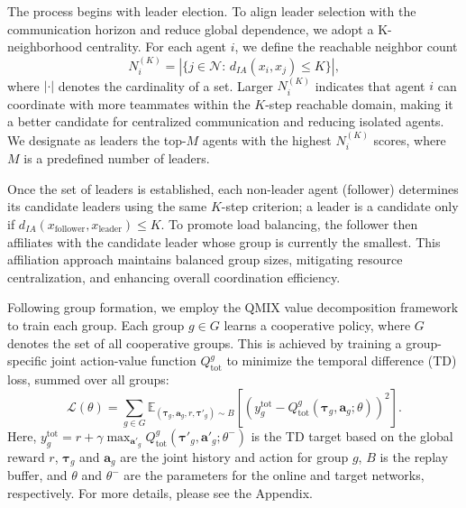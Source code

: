 \documentclass[10pt]{article} %
\newcommand{\rev}[1]{#1}
\begin{document}
The process begins with leader election. To align leader selection with the communication horizon and reduce global dependence, we adopt a K-neighborhood centrality. For each agent $i$, we define the reachable neighbor count
\[
N_i^{(K)} = |\{j \in \mathcal{N}:\, d_{IA}(x_i, x_j) \le K\}|,
\]
\rev{where $|\cdot|$ denotes the cardinality of a set.} Larger $N_i^{(K)}$ indicates that agent $i$ can coordinate with more teammates within the $K$-step reachable domain, making it a better candidate for centralized communication and reducing isolated agents. We designate as leaders the top-$M$ agents with the highest $N_i^{(K)}$ scores, where $M$ is a predefined number of leaders.

Once the set of leaders is established, each non-leader agent (follower) determines its candidate leaders using the same $K$-step criterion; a leader is a candidate only if $d_{IA}(x_{\text{follower}}, x_{\text{leader}}) \le K$. To promote load balancing, the follower then affiliates with the candidate leader whose group is currently the smallest. This affiliation approach maintains balanced group sizes, mitigating resource centralization, and enhancing overall coordination efficiency.

Following group formation, we employ the QMIX value decomposition framework to train each group. Each group $g \in G$ learns a cooperative policy, where $G$ denotes the set of all cooperative groups. This is achieved by training a group-specific joint action-value function $Q_{\text{tot}}^g$ to minimize the temporal difference (TD) loss, summed over all groups:
\[ \mathcal{L}(\theta) = \sum_{g \in G} \mathbb{E}_{(\boldsymbol{\tau}_g, \mathbf{a}_g, r, \boldsymbol{\tau}'_g) \sim B} \left[ (y_g^{\text{tot}} - Q_{\text{tot}}^g(\boldsymbol{\tau}_g, \mathbf{a}_g; \theta))^2 \right]. \]
Here, $y_g^{\text{tot}} = r + \gamma \max_{\mathbf{a}'_g} Q_{\text{tot}}^g(\boldsymbol{\tau}'_g, \mathbf{a}'_g; \theta^-)$ is the TD target based on the global reward $r$, $\boldsymbol{\tau}_g$ and $\mathbf{a}_g$ are the joint history and action for group $g$, $B$ is the replay buffer, and $\theta$ and $\theta^-$ are the parameters for the online and target networks, respectively. For more details, please see the Appendix.
\end{document}

